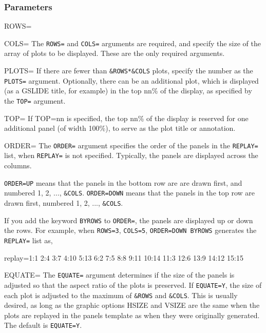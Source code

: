 \subsubsection*{Parameters}%

\begin{proglist}

\item[ROWS=]
\item[COLS=]
The \texttt{ROWS=} and \texttt{COLS=} arguments are required, and specify the
size of the array of plots to be displayed. These are the only
required arguments.

\item[PLOTS=]
If there are fewer than \texttt{\&ROWS*\&COLS} plots, specify the number
as the \texttt{PLOTS=} argument. Optionally, there can be an additional
plot, which is displayed (as a GSLIDE title, for example) in
the top nn\% of the display, as specified by the \texttt{TOP=} argument.

\item[TOP=]
If TOP=nn is specified, the top nn\% of the display is reserved
for one additional panel (of width 100\%), to serve as the plot
title or annotation.

\item[ORDER=]
The \texttt{ORDER=} argument specifies the order of the panels in the
\texttt{REPLAY=} list, when \texttt{REPLAY=} is not specified. 
Typically, the panels are displayed across the columns.

\texttt{ORDER=UP} means that the panels in the bottom row are
are drawn first, and  numbered 1, 2, ..., \texttt{\&COLS}. \texttt{ORDER=DOWN} means
that the panels in the top row are drawn first, numbered 1, 2, ..., \texttt{\&COLS}.

If you add the keyword \texttt{BYROWS} to \texttt{ORDER=}, the panels are
displayed up or down the rows.  For example, when \texttt{ROWS=3}, \texttt{COLS=5},
\texttt{ORDER=DOWN BYROWS} generates the \texttt{REPLAY=} list as,
\begin{listing}
       replay=1:1  2:4  3:7  4:10  5:13
              6:2  7:5  8:8  9:11 10:14
             11:3 12:6 13:9 14:12 15:15
\end{listing}

\item[EQUATE=]
The \texttt{EQUATE=} argument determines if the size of the panels is adjusted
so that the aspect ratio of the plots is preserved.  If \texttt{EQUATE=Y},
the size of each plot is adjusted to the maximum of \texttt{\&ROWS} and \texttt{\&COLS}.
This is usually desired, as long as the graphic options HSIZE and
VSIZE are the same when the plots are replayed in the panels
template as when they were originally generated.  The default is
\texttt{EQUATE=Y}.


\end{proglist}
